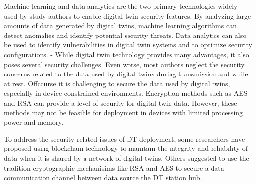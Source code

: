 Machine learning and data analytics are the two primary technologies widely used by study authors to enable digital twin security features. By analyzing large amounts of data generated by digital twins, machine learning algorithms can detect anomalies and identify potential security threats. Data analytics can also be used to identify vulnerabilities in digital twin systems and to optimize security configurations.  
- While digital twin technology provides many advantages, it also poses several security challenges. Even worse, most authors neglect the security concerns related to the data used by digital twins during transmission and while at rest. Offcourse it is challenging to secure the data used by digital twins, especially in device-constrained environments. Encryption methods such as AES and RSA can provide a level of security for digital twin data. However, these methods may not be feasible for deployment in devices with limited processing power and memory.  

To address the security related issues of DT deployment, some researchers have proposed using blockchain technology to maintain the integrity and reliability of data when it is shared by a network of digital twins. Others suggested to use the tradition cryptographic mechanisims like RSA and AES to secure a data communication channel between data source the DT station hub. 
